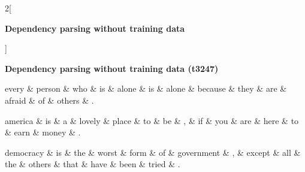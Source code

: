 \documentclass[12pt]{extarticle}
\begin{document}
\begin{multicols*}{2}[
\centerline{\Huge\bf Dependency parsing without training data}
\vspace{2ex}
]
\end{multicols*}



\cleardoublepage
\centerline{\Huge\bf Dependency parsing without training data (t3247)}


\begin{dependency}[theme = simple]
\begin{deptext}[column sep=1em]
     every \& person \& who \& is \& alone \& is \& alone \& because \& they \& are \& afraid \& of \& others \& .  \\
\end{deptext}
\end{dependency}

\begin{dependency}[theme = simple]
\begin{deptext}[column sep=1em]
     america \& is \& a \& lovely \& place \& to \& be \& , \& if \& you \& are \& here \& to \& earn \& money \& .  \\
\end{deptext}
\end{dependency}


\begin{dependency}[theme = simple]
\begin{deptext}[column sep=1em]
     democracy \& is \& the \& worst \& form \& of \& government \& , \& except \& all \& the \& others \& that \& have \& been \& tried \& .  \\
\end{deptext}
\end{dependency}
\end{document}
